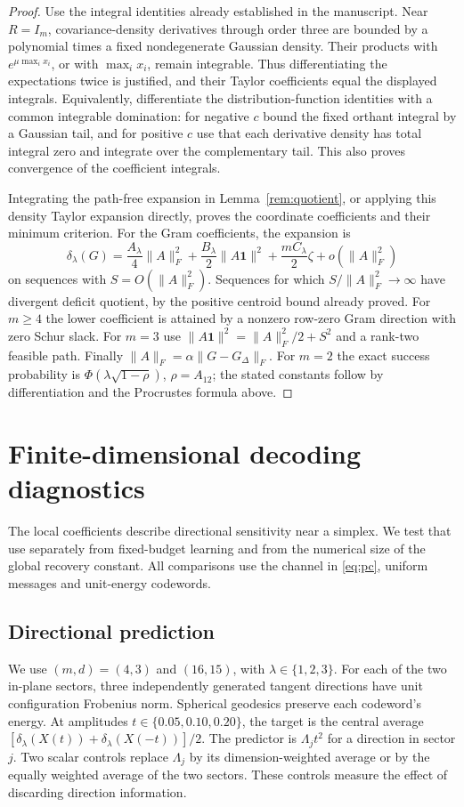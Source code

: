\documentclass[11pt]{article}
\theoremstyle{remark}\newtheorem{remark}[theorem]{Remark}
\newcommand{\one}{\mathbf 1}
\begin{document}
\begin{proof}
Use the integral identities already established in the manuscript.
Near $R=I_m$, covariance-density derivatives through order three are
bounded by a polynomial times a fixed nondegenerate Gaussian density.
Their products with $e^{\mu\max_i x_i}$, or with $\max_i x_i$, remain
integrable.  Thus differentiating the expectations twice is justified,
and their Taylor coefficients equal the displayed integrals.  Equivalently,
differentiate the distribution-function identities with a common
integrable domination: for negative $c$ bound the fixed orthant integral
by a Gaussian tail, and for positive $c$ use that each derivative density
has total integral zero and integrate over the complementary tail.
This also proves convergence of the coefficient integrals.

Integrating the path-free expansion in Lemma~\ref{rem:quotient}, or
applying this density Taylor expansion directly, proves the coordinate
coefficients and their minimum criterion.  For the Gram coefficients,
the expansion is
\[
 \delta_\lambda(G)
 =\frac{A_\lambda}{4}\|A\|_F^2+
   \frac{B_\lambda}{2}\|A\one\|^2+
   \frac{mC_\lambda}{2}\zeta+o(\|A\|_F^2)
\]
on sequences with $S=O(\|A\|_F^2)$.  Sequences for which
$S/\|A\|_F^2\to\infty$ have divergent deficit quotient, by the positive
centroid bound already proved.  For $m\ge4$ the lower coefficient is
attained by a nonzero row-zero Gram direction with zero Schur slack.
For $m=3$ use
$\|A\one\|^2=\|A\|_F^2/2+S^2$ and a rank-two feasible path.
Finally $\|A\|_F=\alpha\|G-G_\Delta\|_F$.
For $m=2$ the exact success probability is
$\Phi(\lambda\sqrt{1-\rho})$, $\rho=A_{12}$; the stated constants follow
by differentiation and the Procrustes formula above.
\end{proof}



\section{Finite-dimensional decoding diagnostics}\label{sec:application}
The local coefficients describe directional sensitivity near a simplex.
We test that use separately from fixed-budget learning and from the numerical
size of the global recovery constant. All comparisons use the channel in
\eqref{eq:pc}, uniform messages and unit-energy codewords.

\subsection{Directional prediction}
We use $(m,d)=(4,3)$ and $(16,15)$, with $\lambda\in\{1,2,3\}$.
For each of the two in-plane sectors, three independently generated tangent
directions have unit configuration Frobenius norm. Spherical geodesics preserve
each codeword's energy. At amplitudes $t\in\{0.05,0.10,0.20\}$, the target is
the central average $[\delta_\lambda(X(t))+\delta_\lambda(X(-t))]/2$.
The predictor is $\Lambda_jt^2$ for a direction in sector $j$.
Two scalar controls replace $\Lambda_j$ by its dimension-weighted average or
by the equally weighted average of the two sectors.
These controls measure the effect of discarding direction information.
\end{document}
